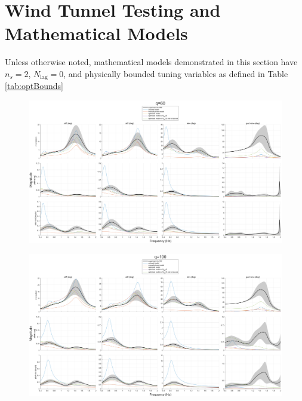 \section{Wind Tunnel Testing and Mathematical Models} %

Unless otherwise noted, mathematical models demonstrated in this section have $n_s=2$, $N_\text{lag}=0$, and physically bounded tuning variables as defined in Table \ref{tab:optBounds}

\begin{landscape}

\begin{figure}[H]
    \centering
    \includegraphics[width=9in]{figs/optFRFplot/FRFCOMPARE_MODEL_COMPARISON_q60.png} 
    \label{fig:optFRFplot_q60}
\end{figure}

\begin{figure}[H]
    \centering
    \includegraphics[width=9in]{figs/optFRFplot/FRFCOMPARE_MODEL_COMPARISON_q100.png} 
    \label{fig:optFRFplot_q100}
\end{figure}


\end{landscape}
